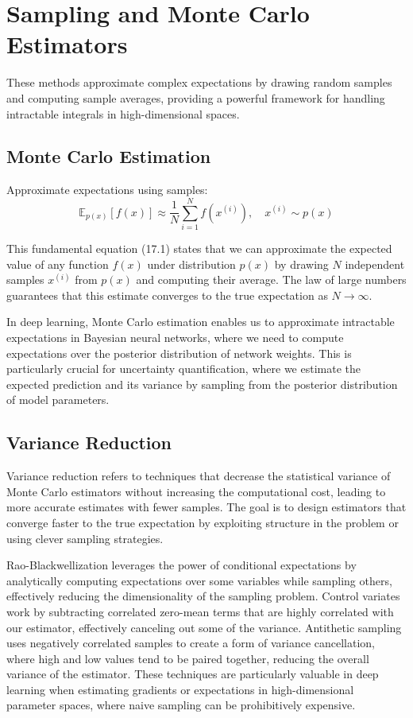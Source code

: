 
\section{Sampling and Monte Carlo Estimators }
\label{sec:mc-estimators}

These methods approximate complex expectations by drawing random samples and computing sample averages, providing a powerful framework for handling intractable integrals in high-dimensional spaces.

\subsection{Monte Carlo Estimation}

Approximate expectations using samples:
\begin{equation}
\mathbb{E}_{p(x)}[f(x)] \approx \frac{1}{N} \sum_{i=1}^{N} f(x^{(i)}), \quad x^{(i)} \sim p(x)
\end{equation}

This fundamental equation (17.1) states that we can approximate the expected value of any function $f(x)$ under distribution $p(x)$ by drawing $N$ independent samples $x^{(i)}$ from $p(x)$ and computing their average. The law of large numbers guarantees that this estimate converges to the true expectation as $N \to \infty$.

In deep learning, Monte Carlo estimation enables us to approximate intractable expectations in Bayesian neural networks, where we need to compute expectations over the posterior distribution of network weights. This is particularly crucial for uncertainty quantification, where we estimate the expected prediction and its variance by sampling from the posterior distribution of model parameters.

\subsection{Variance Reduction}

Variance reduction refers to techniques that decrease the statistical variance of Monte Carlo estimators without increasing the computational cost, leading to more accurate estimates with fewer samples. The goal is to design estimators that converge faster to the true expectation by exploiting structure in the problem or using clever sampling strategies.

Rao-Blackwellization leverages the power of conditional expectations by analytically computing expectations over some variables while sampling others, effectively reducing the dimensionality of the sampling problem. Control variates work by subtracting correlated zero-mean terms that are highly correlated with our estimator, effectively canceling out some of the variance. Antithetic sampling uses negatively correlated samples to create a form of variance cancellation, where high and low values tend to be paired together, reducing the overall variance of the estimator. These techniques are particularly valuable in deep learning when estimating gradients or expectations in high-dimensional parameter spaces, where naive sampling can be prohibitively expensive.


